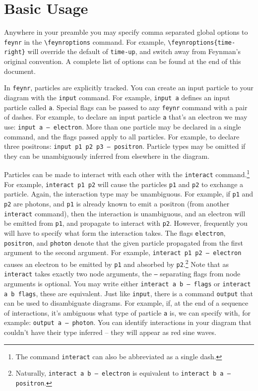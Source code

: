 \documentclass[12pt]{article}
\newcommand{\feynR}{\texttt{feynr}}
\begin{document}
\section*{Basic Usage}
Anywhere in your preamble you may specify comma separated global options to \feynR{} in the \texttt{\textbackslash{}feynroptions} command.
For example, \texttt{\textbackslash{}feynroptions\{time-right\}} will override the default of \texttt{time-up}, and switch away from Feynman's original convention.
A complete list of options can be found at the end of this document.

In \feynR{}, particles are explicitly tracked.
You can create an input particle to your diagram with the \texttt{input} command.
For example, \texttt{input a} defines an input particle called \texttt{a}.
Special flags can be passed to any \feynR{} command with a pair of dashes.
For example, to declare an input particle \texttt{a} that's an electron we may use: \mbox{\texttt{input a -- electron}}.
More than one particle may be declared in a single command, and the flags passed apply to all particles.
For example, to declare three positrons: \mbox{\texttt{input p1 p2 p3 -- positron}}.
Particle types may be omitted if they can be unambiguously inferred from elsewhere in the diagram.

Particles can be made to interact with each other with the \texttt{interact} command.\footnote{The command \texttt{interact} can also be abbreviated as a single dash.}
For example, \texttt{interact p1 p2} will cause the particles \texttt{p1} and \texttt{p2} to exchange a particle.
Again, the interaction type may be unambiguous.
For example, if \texttt{p1} and \texttt{p2} are photons, and \texttt{p1} is already known to emit a positron (from another \texttt{interact} command), then the interaction is unambiguous, and an electron will be emitted from \texttt{p1}, and propagate to interact with \texttt{p2}.
However, frequently you will have to specify what form the interaction takes.
The flags \texttt{electron}, \texttt{positron}, and \texttt{photon} denote that the given particle propagated from the first argument to the second argument.
For example, \texttt{interact p1 p2 -- electron} causes an electron to be emitted by \texttt{p1} and absorbed by \texttt{p2}.\footnote{Naturally, \texttt{interact a b -- electron} is equivalent to \texttt{interact b a -- positron}.}
Note that as \texttt{interact} takes exactly two node arguments, the \texttt{--} separating flags from node arguments is optional.
You may write either \mbox{\texttt{interact a b -- flags}} or \texttt{interact a b flags}, these are equivalent.
Just like \texttt{input}, there is a command \texttt{output} that can be used to disambiguate diagrams.
For example, if, at the end of a sequence of interactions, it's ambiguous what type of particle \texttt{a} is, we can specify with, for example: \texttt{output a -- photon}.
You can identify interactions in your diagram that couldn't have their type inferred -- they will appear as red sine waves.
\end{document}
